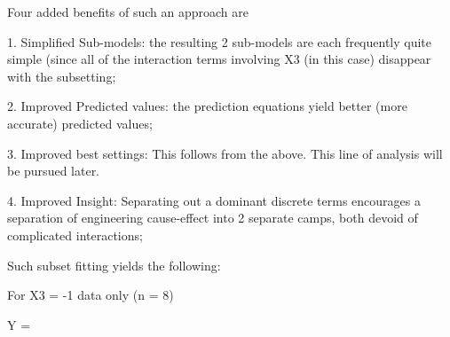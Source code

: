       Four added benefits of such an approach are

         1. Simplified Sub-models: the resulting 2
            sub-models are each frequently quite simple
            (since all of the interaction terms
            involving X3 (in this case) disappear with
            the subsetting;

         2. Improved Predicted values: the prediction
            equations yield better (more accurate)
            predicted values;

         3. Improved best settings: This follows from
            the above.  This line of analysis will be
            pursued later.

         4. Improved Insight: Separating out a dominant
            discrete terms encourages a separation of
            engineering cause-effect into 2 separate
            camps, both devoid of complicated
            interactions;

Such subset fitting yields the following:

   For X3 = -1 data only (n = 8)

        Y =
